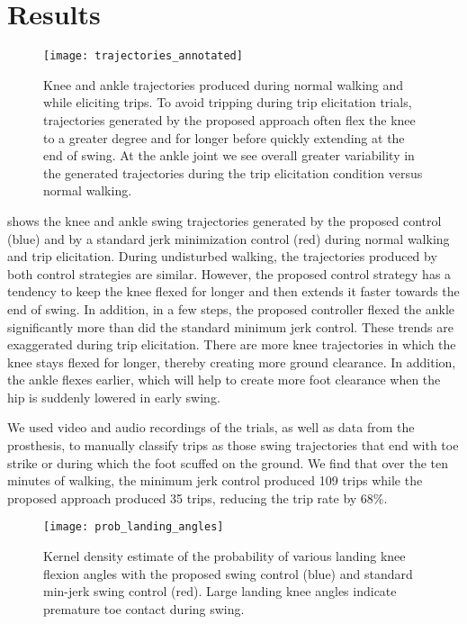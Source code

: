 \section{Results}

\begin{figure}[t]
    \centering
    \texttt{[image: trajectories\_annotated]}
    \caption{Knee and ankle trajectories produced during normal walking and
    while eliciting trips. To avoid tripping during trip elicitation trials,
    trajectories generated by the proposed approach often flex the knee to a
    greater degree and for longer before quickly extending at the end of swing.
    At the ankle joint we see overall greater variability in the generated
    trajectories during the trip elicitation condition versus normal walking.}
    \label{fig:trajectories}
\end{figure}

 shows the knee and ankle swing trajectories generated by
the proposed control (blue) and by a standard jerk minimization control (red)
during normal walking and trip elicitation. During undisturbed walking, the
trajectories produced by both control strategies are similar. However, the
proposed control strategy has a tendency to keep the knee flexed for longer and
then extends it faster towards the end of swing. In addition, in a few steps,
the proposed controller flexed the ankle significantly more than did the
standard minimum jerk control.  These trends are exaggerated during trip
elicitation. There are more knee trajectories in which the knee stays flexed for
longer, thereby creating more ground clearance. In addition, the ankle flexes
earlier, which will help to create more foot clearance when the hip is suddenly
lowered in early swing. 

We used video and audio recordings of the trials, as well as data from the
prosthesis, to manually classify trips as those swing trajectories that end with
toe strike or during which the foot scuffed on the ground. We find that over the
ten minutes of walking, the minimum jerk control produced 109 trips while the
proposed approach produced 35 trips, reducing the trip rate by 68\%.

\begin{figure}[t]
    \centering
    \texttt{[image: prob\_landing\_angles]}
    \caption{Kernel density estimate of the probability of various landing knee
    flexion angles with the proposed swing control (blue) and standard min-jerk
    swing control (red). Large landing knee angles indicate premature toe
    contact during swing.}
    \label{fig:p_landing_angle}
\end{figure}

